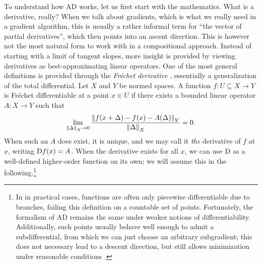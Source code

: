 To understand how AD works, let us first start with the mathematics.  What is a derivative, really?
When we talk about gradients, which is what we really need in a gradient algorithm, this is usually
a rather informal term for \enquote{the vector of partial derivatives}, which then points into an
ascent direction.  This is however not the most natural form to work with in a compositional
approach.  Instead of starting with a limit of tangent slopes, more insight is provided by viewing
derivatives as best-approximating linear operators.  One of the most general definitions is provided
through the \emph{Fréchet derivative} \parencite[p. 463]{bronstein1995taschenbuch}, essentially a
generalization of the total differential.  Let \(X\) and \(Y\) be normed spaces.  A function
\(f: U \subseteq X \to Y\) is Fréchet differentiable at a point \(x \in U\) if there exists a
bounded linear operator \(A: X \to Y\) such that
\begin{equation}
  \label{eq:frechet}
  \lim_{\left\lVert\Delta\right\rVert_X \to 0} \frac{\left\lVert f(x + \Delta) - f(x) -
      A(\Delta)\right\rVert_Y}{\left\lVert\Delta\right\rVert_X} = 0.
\end{equation}
When such an \(A\) does exist, it is unique, and we may call it \emph{the} derivative of \(f\) at
\(x\), writing \(\mathop{}\!\mathrm{D} f(x) = A\).  When the derivative exists for all \(x\), we can use \(\mathop{}\!\mathrm{D}\) as
a well-defined higher-order function on its own; we will assume this in the following.\footnote{In
  in practical cases, functions are often only piecewise differentiable due to branches, failing
  this definition on a countable set of points.  Fortunately, the formalism of AD remains the same
  under weaker notions of differentiability.  Additionally, such points usually behave well enough
  to admit a subdifferential, from which we can just choose an arbitrary subgradient; this does not
  necessary lead to a descent direction, but still allows minimization under reasonable conditions
  \parencites[see][section 6.1]{pock2017convex}[][chapter
  14]{griewank2008evaluating}{abadi2020simple}.}

